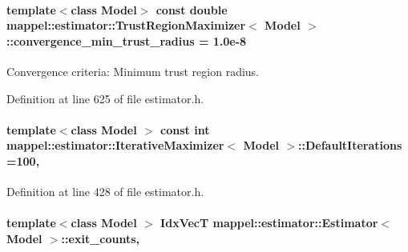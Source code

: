 \paragraph[{\texorpdfstring{convergence\+\_\+min\+\_\+trust\+\_\+radius}{convergence_min_trust_radius}}]{\setlength{\rightskip}{0pt plus 5cm}template$<$class Model$>$ const double {\bf mappel\+::estimator\+::\+Trust\+Region\+Maximizer}$<$ Model $>$\+::convergence\+\_\+min\+\_\+trust\+\_\+radius = 1.\+0e-\/8\hspace{0.3cm}{\ttfamily [static]}}\hypertarget{classmappel_1_1estimator_1_1TrustRegionMaximizer_add5c14c259ffcdd9040832a9a51a136c}{}\label{classmappel_1_1estimator_1_1TrustRegionMaximizer_add5c14c259ffcdd9040832a9a51a136c}


Convergence criteria\+: Minimum trust region radius. 



Definition at line 625 of file estimator.\+h.

\paragraph[{\texorpdfstring{Default\+Iterations}{DefaultIterations}}]{\setlength{\rightskip}{0pt plus 5cm}template$<$class Model $>$ const int {\bf mappel\+::estimator\+::\+Iterative\+Maximizer}$<$ Model $>$\+::Default\+Iterations =100\hspace{0.3cm}{\ttfamily [static]}, {\ttfamily [inherited]}}\hypertarget{classmappel_1_1estimator_1_1IterativeMaximizer_ab66c01c2eee630f3fca119f3fe09a19a}{}\label{classmappel_1_1estimator_1_1IterativeMaximizer_ab66c01c2eee630f3fca119f3fe09a19a}


Definition at line 428 of file estimator.\+h.

\paragraph[{\texorpdfstring{exit\+\_\+counts}{exit_counts}}]{\setlength{\rightskip}{0pt plus 5cm}template$<$class Model $>$ {\bf Idx\+VecT} {\bf mappel\+::estimator\+::\+Estimator}$<$ Model $>$\+::exit\+\_\+counts\hspace{0.3cm}{\ttfamily [protected]}, {\ttfamily [inherited]}}\hypertarget{classmappel_1_1estimator_1_1Estimator_aa946d9789a1299d684f83a822a10caa7}{}\label{classmappel_1_1estimator_1_1Estimator_aa946d9789a1299d684f83a822a10caa7}


